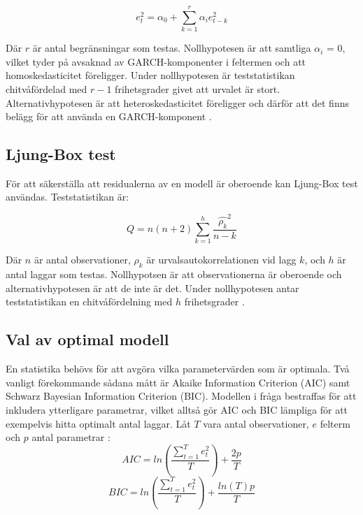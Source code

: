 \documentclass[11pt]{article}
\numberwithin{equation}{section}
\numberwithin{table}{section}
\numberwithin{figure}{section}
\begin{document}
\begin{equation}
    e_t^2=\alpha_0+\sum_{k=1}^{r}\alpha_ie_{t-k}^2
\end{equation}

Där $r$ är antal begränsningar som testas. Nollhypotesen är att samtliga \(\alpha_i\) = 0, vilket tyder på avsaknad av GARCH-komponenter i feltermen och att homoskedasticitet föreligger. Under nollhypotesen är teststatistikan chitvåfördelad med $r-1$ frihetsgrader givet att urvalet är stort. Alternativhypotesen är att heteroskedasticitet föreligger och därför att det finns belägg för att använda en GARCH-komponent \parencite{engle1982autoregressive}. 

\subsection{Ljung-Box test}
För att säkerställa att residualerna av en modell är oberoende kan Ljung-Box test användas. Teststatistikan är:

\begin{equation}
    Q = n(n+2)\sum_{k=1}^{h}\frac{\hat{\rho_k}^2}{n-k}
\end{equation}

Där $n$ är antal observationer, $\rho_k$ är urvalsautokorrelationen vid lagg $k$, och $h$ är antal laggar som testas. Nollhypotsen är att observationerna är oberoende och alternativhypotesen är att de inte är det. Under nollhypotesen antar teststatistikan en chitvåfördelning med $h$ frihetsgrader \parencite{box1970distribution}.

\subsection{Val av optimal modell}
En statistika behövs för att avgöra vilka parametervärden som är optimala. Två vanligt förekommande sådana mått är Akaike Information Criterion (AIC) samt Schwarz Bayesian Information Criterion (BIC). Modellen i fråga bestraffas för att inkludera ytterligare parametrar, vilket alltså gör AIC och BIC lämpliga för att exempelvis hitta optimalt antal laggar. Låt $T$ vara antal observationer, $e$ felterm och $p$ antal parametrar \parencite[][s.76 f.]{montgomery2015forecasting}:
\begin{equation}
    AIC = ln\left( \frac{\sum_{t=1}^{T}e^2_t}{T} \right)+\frac{2p}{T}
\end{equation}
\begin{equation}
    BIC = ln\left( \frac{\sum_{t=1}^{T}e^2_t}{T} \right)+\frac{ln(T)p}{T}
\end{equation}
\end{document}
